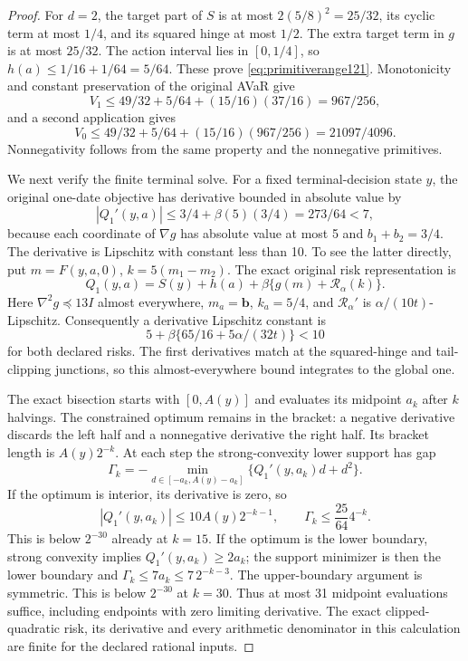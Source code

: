 \begin{proof}
For \(d=2\), the target part of \(S\) is at most
\(2(5/8)^2=25/32\), its cyclic term at most
\(1/4\), and its squared hinge at most \(1/2\).
The extra target term in \(g\) is at most
\(25/32\).  The action interval lies in
\([0,1/4]\), so \(h(a)\leq1/16+1/64=5/64\).
These prove \eqref{eq:primitiverange121}.
Monotonicity and constant preservation of the
original AVaR give
\[
 V_1\leq49/32+5/64+(15/16)(37/16)=967/256,
\]
and a second application gives
\[
 V_0\leq49/32+5/64+(15/16)(967/256)
                                      =21097/4096.
\]
Nonnegativity follows from the same property
and the nonnegative primitives.

We next verify the finite terminal solve.
For a fixed terminal-decision state \(y\),
the original one-date objective has derivative
bounded in absolute value by
\[
 |Q_1'(y,a)|\leq3/4+\beta(5)(3/4)
                        =273/64<7,
\]
because each coordinate of \(\nabla g\) has
absolute value at most 5 and
\(b_1+b_2=3/4\).
The derivative is Lipschitz with constant less
than 10.  To see the latter directly, put
\(m=F(y,a,0)\), \(k=5(m_1-m_2)\).
The exact original risk representation is
\[
 Q_1(y,a)=S(y)+h(a)+
             \beta\{g(m)+\mathcal R_\alpha(k)\}.
\]
Here \(\nabla^2g\preceq13I\) almost everywhere,
\(m_a=\boldsymbol b\),
\(k_a=5/4\), and
\(\mathcal R_\alpha'\) is
\(\alpha/(10t)\)-Lipschitz.
Consequently a derivative Lipschitz constant is
\[
 5+\beta\{65/16+5\alpha/(32t)\}<10
\]
for both declared risks.  The first derivatives
match at the squared-hinge and tail-clipping
junctions, so this almost-everywhere bound
integrates to the global one.

The exact bisection starts with \([0,A(y)]\)
and evaluates its midpoint \(a_k\) after
\(k\) halvings.  The constrained optimum
remains in the bracket: a negative derivative
discards the left half and a nonnegative
derivative the right half.
Its bracket length is \(A(y)2^{-k}\).
At each step the strong-convexity lower
support has gap
\[
 \Gamma_k=-\min_{d\in[-a_k,A(y)-a_k]}
                    \{Q_1'(y,a_k)d+d^2\}.
\]
If the optimum is interior, its derivative
is zero, so
\[
 |Q_1'(y,a_k)|\leq
           10A(y)2^{-k-1},\qquad
 \Gamma_k\leq\frac{25}{64}4^{-k}.
\]
This is below \(2^{-30}\) already at \(k=15\).
If the optimum is the lower boundary,
strong convexity implies \(Q_1'(y,a_k)\geq2a_k\);
the support minimizer is then the lower
boundary and
\(\Gamma_k\leq7a_k\leq7\,2^{-k-3}\).
The upper-boundary argument is symmetric.
This is below \(2^{-30}\) at \(k=30\).
Thus at most 31 midpoint evaluations suffice,
including endpoints with zero limiting
derivative.  The exact clipped-quadratic risk,
its derivative and every arithmetic
denominator in this calculation are finite
for the declared rational inputs.


\end{proof}
